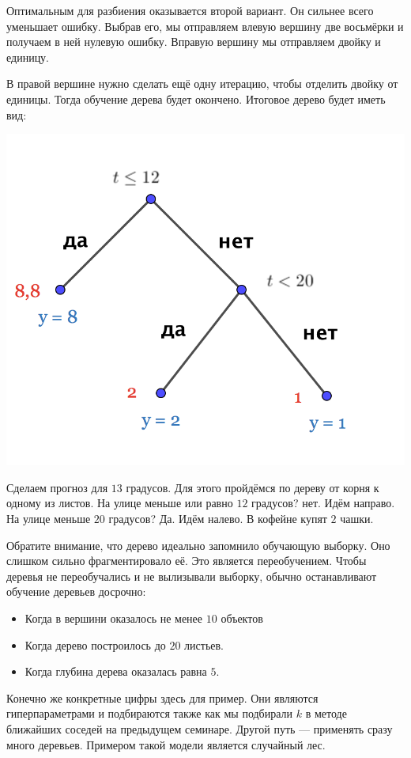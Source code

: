 \documentclass[12pt, a4paper, oneside]{article}
\begin{document}
{Оптимальным для разбиения оказывается второй вариант. Он сильнее всего уменьшает ошибку.  Выбрав его, мы отправляем влевую вершину две восьмёрки и получаем в ней нулевую ошибку. Вправую вершину мы отправляем двойку и единицу. 

В правой вершине нужно сделать ещё одну итерацию, чтобы отделить двойку от единицы. Тогда обучение дерева будет окончено. Итоговое дерево будет иметь вид: 

\begin{center}
	\includegraphics[scale=0.23]{reg_tree_2.png}
\end{center}

Сделаем прогноз для $13$ градусов.  Для этого пройдёмся по дереву от корня к одному из листов. На улице меньше или равно $12$ градусов?  нет. Идём направо. На улице меньше $20$ градусов? Да. Идём налево. В кофейне купят $2$ чашки. 

Обратите внимание, что дерево идеально запомнило обучающую выборку. Оно слишком сильно фрагментировало её. Это является переобучением. Чтобы деревья не переобучались и не вылизывали выборку, обычно останавливают обучение деревьев досрочно: 

\begin{itemize} 
	\item  Когда в вершини оказалось не менее $10$ объектов
	\item  Когда дерево построилось до $20$ листьев. 	
	\item  Когда глубина дерева оказалась равна $5$.
\end{itemize}

Конечно же конкретные цифры здесь для пример. Они являются гиперпараметрами и подбираются также как мы подбирали $k$ в методе ближайших соседей на предыдущем семинаре. Другой путь --- применять сразу много деревьев. Примером такой модели является случайный лес.  
}
\end{document}
